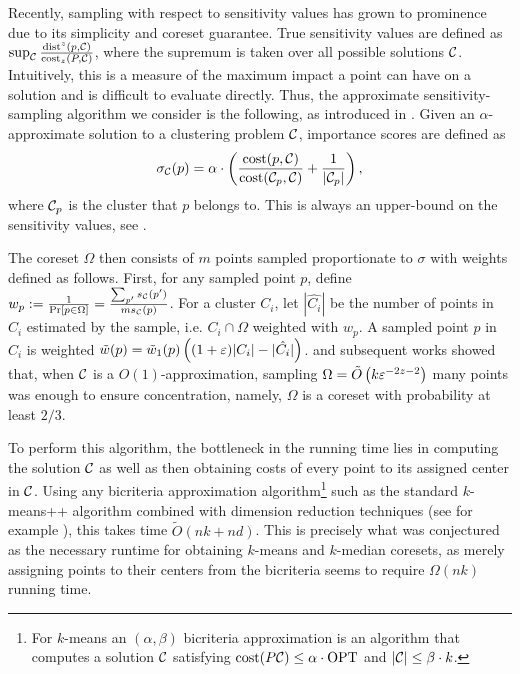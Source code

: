 Recently, sampling with respect to sensitivity values has grown to prominence due to its simplicity and coreset guarantee.  True sensitivity values are defined
as $\sup_{\mathcal C} \frac{\operatorname{dist}^z(p, \mathcal C)}{\operatorname{cost}_z(P, \mathcal C)}$, where the supremum is taken over all possible solutions $\mathcal C$. Intuitively, this is a measure
of the maximum impact a point can have on a solution and is difficult to evaluate directly.
Thus, the approximate sensitivity-sampling algorithm we consider is the following, as introduced in \cite{FeldmanL11}.
Given an $\alpha$-approximate solution to a clustering problem $\mathcal C$, importance scores are defined as
\begin{equation}
\label{eq:sensitivity}
\sigma_\mathcal C(p) = \alpha \cdot \left( \dfrac{\operatorname{cost}(p, \mathcal C)}{\operatorname{cost}(\mathcal C_{p}, \mathcal C)} + \dfrac{1}{|\mathcal C_p|} \right),
\end{equation}
where $\mathcal C_p$ is the cluster that $p$ belongs to. This is always an upper-bound on the sensitivity values, see \cite{FL11,FeldmanSS20}.

The coreset $\Omega$ then consists of $m$ points sampled proportionate to $\sigma$ with weights defined as follows. First, for any sampled point $p$, define $w_p :=
\frac{1}{\Pr[p \in \Omega]} = \frac{\sum_{p'} s_\mathcal C(p')}{m s_\mathcal C(p)}$. For a cluster $C_i$, let $|\hat{C_i}|$ be the number of points in $C_i$ estimated by the
sample, i.e. $C_i \cap \Omega$ weighted with $w_p$. A sampled point $p$ in $C_i$ is
weighted $\tilde w(p) = \tilde w_1(p) \left( (1+\varepsilon)|C_i| - |\hat{C_i}|\right)$.  \cite{FeldmanL11} and subsequent works showed that, when $\mathcal C$ is
a $O(1)$-approximation, sampling $\Omega = \tilde O\left( k \varepsilon^{-2z-2}\right)$ many points was enough to ensure concentration, namely, $\Omega$ is a coreset with
probability at least $2/3$.

To perform this algorithm, the bottleneck in the running time lies in computing the solution $\mathcal C$ as well as then obtaining costs of every point to its
assigned center in $\mathcal C$. Using any bicriteria approximation algorithm\footnote{For $k$-means an $(\alpha,\beta)$ bicriteria approximation is an algorithm
that computes a solution $\mathcal C$ satisfying $\operatorname{cost}(P\mathcal C)\leq \alpha\cdot \text{OPT}$ and $|\mathcal C|\leq \beta\cdot k$.} such as the standard $k$-means++ algorithm
\cite{ArV07} combined with dimension reduction techniques (see for example \cite{BecchettiBC0S19,CohenEMMP15,MakarychevMR19}), this takes time $\tilde O(nk
+nd)$. This is precisely what was conjectured as the necessary runtime for obtaining $k$-means and $k$-median coresets, as merely assigning points to their
centers from the bicriteria seems to require $\Omega(nk)$ running time.

